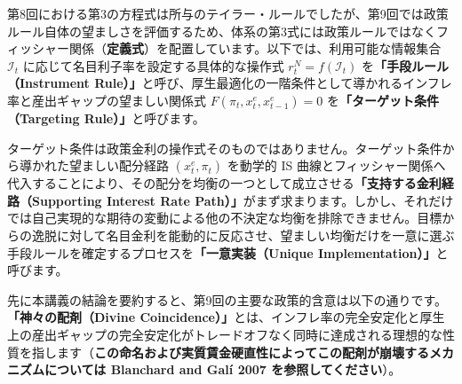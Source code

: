 \documentclass[
  japanese,
  lualatex,
  ja=standard,
  12pt,
  a4paper]{ltjsarticle}
\begin{document}
第8回における第3の方程式は所与のテイラー・ルールでしたが、第9回では政策ルール自体の望ましさを評価するため、体系の第3式には政策ルールではなくフィッシャー関係（\textbf{定義式}）を配置しています。以下では、利用可能な情報集合
\(\mathcal{I}_t\) に応じて名目利子率を設定する具体的な操作式
\(r_t^N=f(\mathcal{I}_t)\) を\textbf{「手段ルール（Instrument
Rule）」}と呼び、厚生最適化の一階条件として導かれるインフレ率と産出ギャップの望ましい関係式
\(F(\pi_t, x_t^e, x_{t-1}^e)=0\) を\textbf{「ターゲット条件（Targeting
Rule）」}と呼びます。

ターゲット条件は政策金利の操作式そのものではありません。ターゲット条件から導かれた望ましい配分経路
\((x_t^e, \pi_t)\) を動学的 IS
曲線とフィッシャー関係へ代入することにより、その配分を均衡の一つとして成立させる\textbf{「支持する金利経路（Supporting
Interest Rate
Path）」}がまず求まります。しかし、それだけでは自己実現的な期待の変動による他の不決定な均衡を排除できません。目標からの逸脱に対して名目金利を能動的に反応させ、望ましい均衡だけを一意に選ぶ手段ルールを確定するプロセスを\textbf{「一意実装（Unique
Implementation）」}と呼びます。

先に本講義の結論を要約すると、第9回の主要な政策的含意は以下の通りです。\textbf{「神々の配剤（Divine
Coincidence）」}とは、インフレ率の完全安定化と厚生上の産出ギャップの完全安定化がトレードオフなく同時に達成される理想的な性質を指します（\textbf{この命名および実質賃金硬直性によってこの配剤が崩壊するメカニズムについては
Blanchard and Galí 2007 を参照してください}）。
\end{document}
